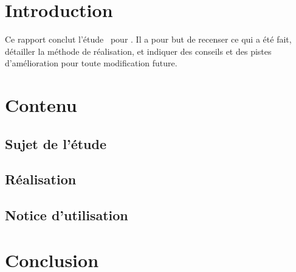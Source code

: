 \section{Introduction}

Ce rapport conclut l’étude \tagEtudeNum~pour \tagClientCompagny. Il a pour but de recenser ce qui a été fait, détailler la méthode de réalisation, et indiquer des conseils et des pistes d’amélioration pour toute modification future.
\section{Contenu}
\subsection{Sujet de l’étude}
\subsection{Réalisation}
\subsection{Notice d’utilisation}
\section{Conclusion}
